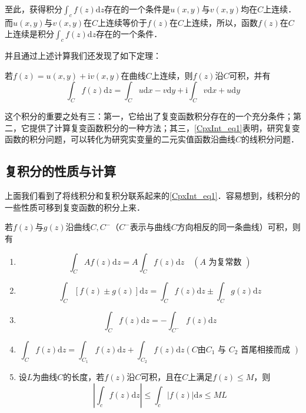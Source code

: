 至此，获得积分$\displaystyle \int_{c} f(z) \mathrm{d} z$存在的一个条件是$u(x, y)$与$v(x, y)$均在$C$上连续．而$u(x, y)$与$v(x, y)$在$C$上连续等价于$ f (z)$在$C$上连续，所以，函数$ f (z)$在$C$上连续是积分$\displaystyle \int_{c} f(z) \mathrm{d} z$存在的一个条件．

并且通过上述计算我们还发现了如下定理：
\begin{theorem}{} 
若$ f (z) = u(x, y) + \mathrm iv(x, y)$在曲线$C$上连续，则$f (z)$沿$C$可积，并有
\begin{equation} \label{CpxInt_eq1}
\int_{C} f(z) \mathrm{d} z=\int_{C} u \mathrm{d} x-v \mathrm{d} y+\mathrm{i} \int_{C} v \mathrm{d} x+u \mathrm{d} y
\end{equation}
\end{theorem}

这个积分的重要之处有三：第一，它给出了复变函数积分存在的一个充分条件；第二，它提供了计算复变函数积分的一种方法；其三，\autoref{CpxInt_eq1}表明，研究复变函数的积分问题，可以转化为研究实变量的二元实值函数沿曲线$C $的线积分问题．

\subsection{复积分的性质与计算}

上面我们看到了将线积分和复积分联系起来的\autoref{CpxInt_eq1}．容易想到，线积分的一些性质可移到复变函数的积分上来．

若$ f (z)$与$g (z)$沿曲线$C,C^-$（$C^-$表示与曲线$C$方向相反的同一条曲线）可积，则有
\begin{enumerate}
\item \begin{equation}
\int_{C} A f(z) \mathrm{d} z=A \int_{C} f(z) \mathrm{d} z \quad(A \text { 为复常数 })
\end{equation}
\item \begin{equation}
\int_{C}[f(z) \pm g(z)] \mathrm{d} z=\int_{C} f(z) \mathrm{d} z \pm \int_{C} g(z) \mathrm{d} z
\end{equation}
\item \begin{equation}
\int_{C} f(z) \mathrm{d} z=-\int_{C^{-}} f(z) \mathrm{d} z
\end{equation}
\item \begin{equation}
\int_{C} f(z) \mathrm{d} z=\int_{C_{1}} f(z) \mathrm{d} z+\int_{C_{2}} f(z) \mathrm{d} z\left(C由 C_{1} \text { 与 } C_{2} \text { 首尾相接而成 }\right)
\end{equation}
\item 设$ L$为曲线$C$的长度，若$ f (z)$沿$C$可积，且在$C$上满足$ f (z) \leqslant M $，则
\begin{equation} \label{CpxInt_eq2}
\left|\int_{c} f(z) \mathrm{d} z\right| \leqslant \int_{c}|f(z)| \mathrm{d} s \leqslant M L
\end{equation}
\end{enumerate}

